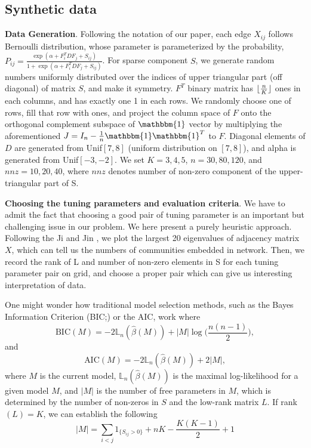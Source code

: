 \documentclass[AMS,STIX1COL]{WileyNJD-v2}
\DeclarePairedDelimiter\floor{\lfloor}{\rfloor}
\begin{document}
\subsection{Synthetic data}
\textbf{Data Generation}.
Following the notation of our paper, each edge $X_{ij}$ follows Bernoulli distribution, whose parameter is parameterized by the probability, $P_{ij}=\frac{\exp (
\alpha+F_{i}^{T}DF_{j} +  S_{ij})}{1+\exp(\alpha+F_{i}^{T}DF_{j}+S_{ij})}$.
For sparse component $S$, we generate random numbers uniformly distributed over the indices of upper triangular part (off diagonal) of matrix $S$, and make it symmetry.
$F^{T}$ binary matrix has $\floor{\frac{n}{K}}$ ones in each columns, and has exactly one 1 in each rows.
We randomly choose one of rows, fill that row with ones, and project the column space of $F$ onto the orthogonal complement subspace of $\mathbbm{1}$ vector by multiplying the aforementioned $J = I_{n}-\frac{1}{n}\mathbbm{1}\mathbbm{1}^T$ to $F$.
Diagonal elements of $D$ are generated from Unif$[7,8]$ (uniform distribution on $[7,8]$), and alpha is generated from Unif$[-3,-2]$.
We set $K=3,4,5$, $n=30,80,120$, and $nnz = 10, 20, 40$, where $nnz$ denotes number of non-zero component of the upper-triangular part of S.

\textbf{Choosing the tuning parameters and evaluation criteria}.
We have to admit the fact that choosing a good pair of tuning parameter is an important but challenging issue in our problem.
We here present a purely heuristic approach.
Following the Ji and Jin \cite{ji2016coauthorship}, we plot the largest 20 eigenvalues of adjacency matrix $X$, which can tell us the numbers of communities embedded in network.
Then, we record the rank of L and number of non-zero elements in S for each tuning parameter pair on grid, and choose a proper pair which can give us interesting interpretation of data.

One might wonder how traditional model selection methods, such as the Bayes Information Criterion (BIC;\cite{schwarz1978estimating}) or the AIC, work where
\[
\mbox{BIC}(M) = -2  \mathbb{L}_n( \hat{\beta}(M)) + |M| \log \bigg(\frac{n(n-1)}{2}\bigg),
\]
and
\[
\mbox{AIC}(M) = -2  \mathbb{L}_n( \hat{\beta}(M)) + 2|M|,
\]
where $M$ is the current model,
$\mathbb{L}_n( \hat{\beta}(M))$ is the maximal log-likelihood for a given model $M$,
and $|M|$ is the number of free parameters in $M$, which is determined by the number of non-zeros in $S$ and the low-rank matrix $L$.
If rank$(L)=K$, we can establish the following
\[
|M| = \sum_{i < j}1_{\{S_{ij} > 0\}} + n K - \frac{K(K-1)}{2} + 1
\]
\end{document}
